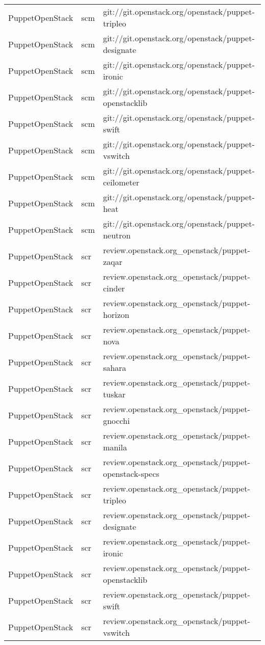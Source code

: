 \begin{center}
\begin{longtable}{|p{4cm}|p{1cm}|p{10cm}|}
PuppetOpenStack&scm&git://git.openstack.org/openstack/puppet-tripleo\\ 
PuppetOpenStack&scm&git://git.openstack.org/openstack/puppet-designate\\ 
PuppetOpenStack&scm&git://git.openstack.org/openstack/puppet-ironic\\ 
PuppetOpenStack&scm&git://git.openstack.org/openstack/puppet-openstacklib\\ 
PuppetOpenStack&scm&git://git.openstack.org/openstack/puppet-swift\\ 
PuppetOpenStack&scm&git://git.openstack.org/openstack/puppet-vswitch\\ 
PuppetOpenStack&scm&git://git.openstack.org/openstack/puppet-ceilometer\\ 
PuppetOpenStack&scm&git://git.openstack.org/openstack/puppet-heat\\ 
PuppetOpenStack&scm&git://git.openstack.org/openstack/puppet-neutron\\ 
PuppetOpenStack&scr&review.openstack.org\_openstack/puppet-zaqar\\ 
PuppetOpenStack&scr&review.openstack.org\_openstack/puppet-cinder\\ 
PuppetOpenStack&scr&review.openstack.org\_openstack/puppet-horizon\\ 
PuppetOpenStack&scr&review.openstack.org\_openstack/puppet-nova\\ 
PuppetOpenStack&scr&review.openstack.org\_openstack/puppet-sahara\\ 
PuppetOpenStack&scr&review.openstack.org\_openstack/puppet-tuskar\\ 
PuppetOpenStack&scr&review.openstack.org\_openstack/puppet-gnocchi\\ 
PuppetOpenStack&scr&review.openstack.org\_openstack/puppet-manila\\ 
PuppetOpenStack&scr&review.openstack.org\_openstack/puppet-openstack-specs\\ 
PuppetOpenStack&scr&review.openstack.org\_openstack/puppet-tripleo\\ 
PuppetOpenStack&scr&review.openstack.org\_openstack/puppet-designate\\ 
PuppetOpenStack&scr&review.openstack.org\_openstack/puppet-ironic\\ 
PuppetOpenStack&scr&review.openstack.org\_openstack/puppet-openstacklib\\ 
PuppetOpenStack&scr&review.openstack.org\_openstack/puppet-swift\\ 
PuppetOpenStack&scr&review.openstack.org\_openstack/puppet-vswitch\\ 

\end{longtable}
\end{center}
